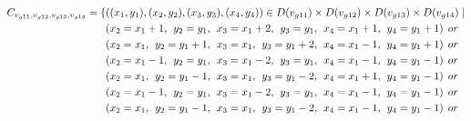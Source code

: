 \begin{align*}
\Const{g11}{g12}{g13}{g14}=\{&((x_{1},y_{1}),(x_{2},y_{2}),(x_{3},y_{3}),(x_{4},y_{4}))\in \Domain{g11}\times \Domain{g12}\times\Domain{g13}\times\Domain{g14}\mid\\
&(x_{2} = x_{1} + 1,\hspace{1ex}y_{2} = y_{1},\hspace{1ex}x_{3} = x_{1} + 2, \hspace{1ex}y_{3} = y_{1},\hspace{1ex}x_{4} = x_{1}+1,\hspace{1ex}y_{4} = y_{1}+1)\hspace{1ex} or\\
&(x_{2} = x_{1},\hspace{1ex}y_{2} = y_{1}+1,\hspace{1ex}x_{3} = x_{1}, \hspace{1ex}y_{3} = y_{1}+2,\hspace{1ex}x_{4} = x_{1}-1,\hspace{1ex}y_{4} = y_{1}+1)\hspace{1ex} or\\
&(x_{2} = x_{1}-1,\hspace{1ex}y_{2} = y_{1},\hspace{1ex}x_{3} = x_{1}-2,\hspace{1ex} y_{3} = y_{1},\hspace{1ex}x_{4} = x_{1}-1,\hspace{1ex}y_{4} = y_{1}-1)\hspace{1ex} or\\
&(x_{2} = x_{1},\hspace{1ex}y_{2} = y_{1}-1,\hspace{1ex}x_{3} = x_{1}, \hspace{1ex}y_{3} = y_{1}-2,\hspace{1ex}x_{4} = x_{1}+1,\hspace{1ex}y_{4} = y_{1}-1)\hspace{1ex} or\\
&(x_{2} = x_{1}-1,\hspace{1ex}y_{2} = y_{1},\hspace{1ex}x_{3} = x_{1}-2, \hspace{1ex}y_{3} = y_{1},\hspace{1ex}x_{4} = x_{1}-1,\hspace{1ex}y_{4} = y_{1}-1)\hspace{1ex} or\\
&(x_{2} = x_{1},\hspace{1ex}y_{2} = y_{1}-1,\hspace{1ex}x_{3} = x_{1}, \hspace{1ex}y_{3} = y_{1}-2,\hspace{1ex}x_{4} = x_{1}-1,\hspace{1ex}y_{4} = y_{1}-1)\hspace{1ex} or\\

\end{align*}
